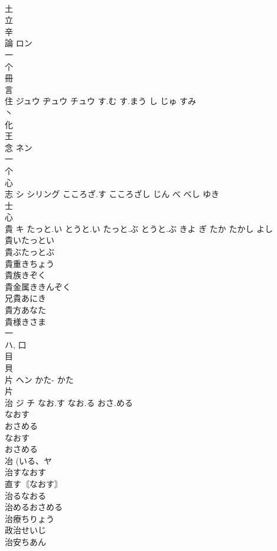 \documentclass[8pt]{extreport}
\begin{document}
\begin{CJK}{UTF8}{min}
\\	土 
\\	立 
\\	辛 
\\	論	ロン		
\\	一 
\\	个 
\\	冊 
\\	言 
\\	住	ジュウ ヂュウ チュウ	す.む す.まう し じゅ すみ	
\\	丶 
\\	化 
\\	王 
\\	念	ネン		
\\	一 
\\	个 
\\	心 
\\	志	シ シリング	こころざ.す こころざし じん べ べし ゆき	
\\	士 
\\	心 
\\	貴	キ	たっと.い とうと.い たっと.ぶ とうと.ぶ きよ ぎ たか たかし よし	
\\	貴いたっとい
\\	貴ぶたっとぶ
\\	貴重きちょう
\\	貴族きぞく
\\	貴金属ききんぞく
\\	兄貴あにき
\\	貴方あなた
\\	貴様きさま
\\	一 
\\	ハ, 口 
\\	目 
\\	貝 
\\	片	ヘン	かた- かた	
\\	片 
\\	治	ジ チ	なお.す なお.る おさ.める	
\\	なおす 
\\	おさめる 
\\	なおす 
\\	おさめる 
\\	冶 (いる、ヤ 
\\	治すなおす
\\	直す〘なおす〙
\\	治るなおる 
\\	治めるおさめる
\\	治療ちりょう
\\	政治せいじ
\\	治安ちあん

\end{CJK}
\end{document}
